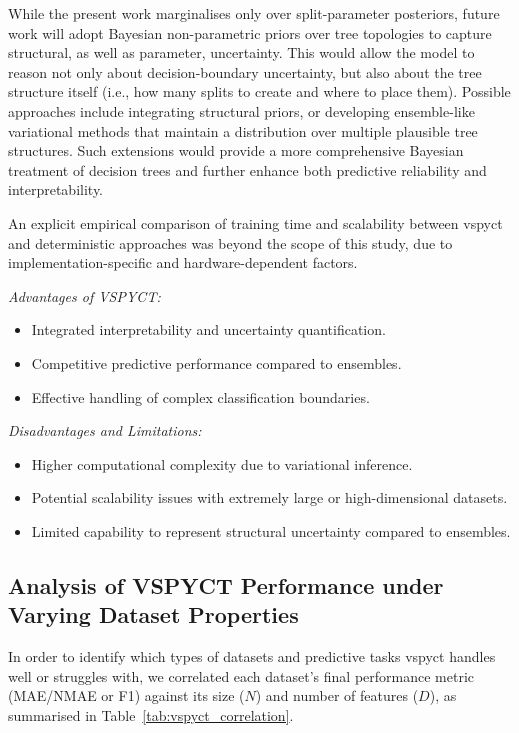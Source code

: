 \documentclass[3p,review,authoryear]{elsarticle}
\begin{document}
While the present work marginalises only over split-parameter posteriors, future work will adopt Bayesian non-parametric priors over tree topologies to capture structural, as well as parameter, uncertainty. This would allow the model to reason not only about decision-boundary uncertainty, but also about the tree structure itself (i.e., how many splits to create and where to place them). Possible approaches include integrating structural priors, or developing ensemble-like variational methods that maintain a distribution over multiple plausible tree structures. Such extensions would provide a more comprehensive Bayesian treatment of decision trees and further enhance both predictive reliability and interpretability.


An explicit empirical comparison of training time and scalability between \gls{vspyct} and deterministic approaches was beyond the scope of this study, due to implementation-specific and hardware-dependent factors.

\textit{Advantages of VSPYCT:}
\begin{itemize}
    \item Integrated interpretability and uncertainty quantification.
    \item Competitive predictive performance compared to ensembles.
    \item Effective handling of complex classification boundaries.
\end{itemize}

\textit{Disadvantages and Limitations:}
\begin{itemize}
    \item Higher computational complexity due to variational inference.
    \item Potential scalability issues with extremely large or high-dimensional datasets.
    \item Limited capability to represent structural uncertainty compared to ensembles.
\end{itemize}

\subsection{Analysis of VSPYCT Performance under Varying Dataset Properties}

In order to identify which types of datasets and predictive tasks \gls{vspyct} handles well or struggles with, we correlated each dataset’s final performance metric (MAE/NMAE or F1) against its size (\(N\)) and number of features (\(D\)), as summarised in Table~\ref{tab:vspyct_correlation}.
\end{document}
